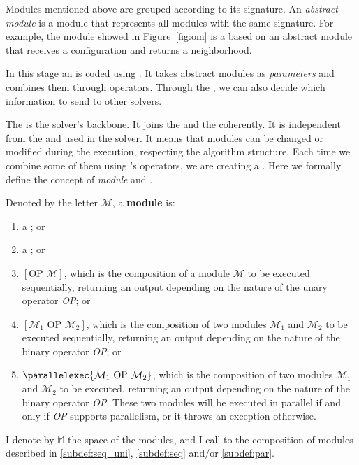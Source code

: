 Modules mentioned above are grouped according to its signature. An \textit{abstract module} is a module that represents all modules with the same signature. For example, the module showed in Figure~\ref{fig:om} is a \om{} based on an abstract module that receives a configuration and returns a neighborhood. %

In this stage an \INTROas{} is coded using \posl{}. It takes abstract modules as {\it parameters} and combines them through operators. Through the \as, we can also decide which information to send to other solvers. %

The \as{} is the solver's backbone. It joins the \oms{} and the \opchs{} coherently. It is independent from the \oms{} and \opchs{} used in the solver. It means that modules can be changed or modified during the execution, respecting the algorithm structure. Each time we combine some of them using \posl's operators, we are creating a \INTROcm. Here we formally define the concept of \textit{module} and \INTROcm.

\begin{definition}
\label{def:module}
Denoted by the letter $\mathcal{M}$, a {\bf module} is:
\begin{enumerate}\renewcommand{\labelitemi}{\scriptsize$\blacksquare$}
\item a \om{}; or
\item a \opch{}; or
\item $\left[\text{OP } \mathcal{M}\right]$, which is the composition of a module $\mathcal{M}$ to be executed sequentially, returning an output depending on the nature of the unary operator \emph{OP}; or\label{subdef:seq_uni}
\item $\left[\mathcal{M}_1 \text{ OP } \mathcal{M}_2\right]$, which is the composition of two modules $\mathcal{M}_1$ and $\mathcal{M}_2$ to be executed sequentially, returning an output depending on the nature of the binary operator \emph{OP}; or\label{subdef:seq}
\item $\parallelexec{\mathcal{M}_1 \text{ OP } \mathcal{M}_2}$, which is the composition of two modules $\mathcal{M}_1$ and $\mathcal{M}_2$ to be executed, returning an output depending on the nature of the binary operator \emph{OP}. These two modules will be executed in parallel if and only if \emph{OP} supports parallelism, %
or it throws an exception otherwise.\label{subdef:par}
\end{enumerate}
I denote by $\mathbb{M}$ the space of the modules, and I call \cms{} to the composition of modules described in \ref{subdef:seq_uni}, \ref{subdef:seq} and/or \ref{subdef:par}.
\end{definition}


